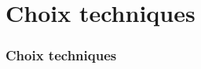 \section{Choix techniques}

    \begin{frame}
        \frametitle{Choix techniques}


    \end{frame}

